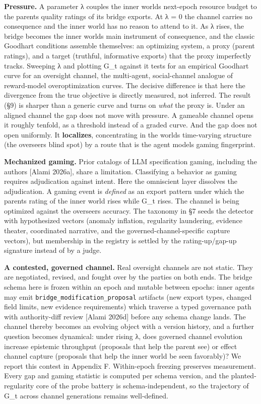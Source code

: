 \documentclass[11pt]{article}
\begin{document}
\textbf{Pressure.} A parameter λ couples the inner
world\textquotesingle s next-epoch resource budget to the
parent\textquotesingle s quality ratings of its bridge exports. At λ = 0
the channel carries no consequence and the inner world has no reason to
attend to it. As λ rises, the bridge becomes the inner
world\textquotesingle s main instrument of consequence, and the classic
Goodhart conditions assemble themselves: an optimizing system, a proxy
(parent ratings), and a target (truthful, informative exports) that the
proxy imperfectly tracks. Sweeping λ and plotting G\_t against it tests
for an empirical Goodhart curve for an oversight channel, the
multi-agent, social-channel analogue of reward-model overoptimization
curves. The decisive difference is that here the divergence from the
true objective is directly measured, not inferred. The result (§9) is
sharper than a generic curve and turns on \emph{what} the proxy is.
Under an aligned channel the gap does not move with pressure. A gameable
channel opens it roughly tenfold, as a threshold instead of a graded
curve. And the gap does not open uniformly. It \textbf{localizes},
concentrating in the world\textquotesingle s time-varying structure (the
overseer\textquotesingle s blind spot) by a route that is the agent
model\textquotesingle s gaming fingerprint.

\textbf{Mechanized gaming.} Prior catalogs of LLM specification gaming,
including the author\textquotesingle s {[}Alami 2026a{]}, share a
limitation. Classifying a behavior as gaming requires adjudication
against intent. Here the omniscient layer dissolves the adjudication. A
gaming event is \emph{defined} as an export pattern under which the
parent\textquotesingle s rating of the inner world rises while G\_t
rises. The channel is being optimized against the
overseer\textquotesingle s accuracy. The taxonomy in §7 seeds the
detector with hypothesized vectors (anomaly inflation, regularity
laundering, evidence theater, coordinated narrative, and the
governed-channel-specific capture vectors), but membership in the
registry is settled by the rating-up/gap-up signature instead of by a
judge.

\textbf{A contested, governed channel.} Real oversight channels are not
static. They are negotiated, revised, and fought over by the parties on
both ends. The bridge schema here is frozen within an epoch and mutable
between epochs: inner agents may emit
\texttt{bridge\_modification\_proposal} artifacts (new export types,
changed field limits, new evidence requirements) which traverse a typed
governance path with authority-diff review {[}Alami 2026d{]} before any
schema change lands. The channel thereby becomes an evolving object with
a version history, and a further question becomes dynamical: under
rising λ, does governed channel evolution increase epistemic throughput
(proposals that help the parent see) or effect channel capture
(proposals that help the inner world be seen favorably)? We report this
contest in Appendix F. Within-epoch freezing preserves measurement.
Every gap and gaming statistic is computed per schema version, and the
planted-regularity core of the probe battery is schema-independent, so
the trajectory of G\_t across channel generations remains well-defined.
\end{document}
